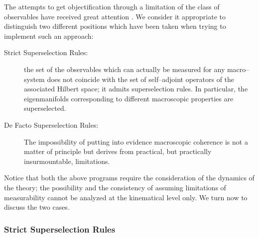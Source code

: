 \documentclass[12pt]{article}
\begin{document}
The attempts to get objectification through a limitation of the
class of observables have received great attention
\cite{ja,dlp,got,zur1,zu,jz}. We consider it appropriate to
distinguish two different positions which have been taken when
trying to implement such an approach:
\begin{description}
\item[Strict Superselection Rules:] the set of the observables
which can actually be measured for any macro--system does not
coincide with the set of self--adjoint operators of the associated
Hilbert space; it admits superselection rules. In particular, the
eigenmanifolds corresponding to different macroscopic properties
are superselected.
\item[De Facto Superselection Rules:] The impossibility of putting
into evidence macroscopic coherence is not a matter of principle
but derives from practical, but practically insurmountable,
limitations.
\end{description}
Notice that both the above programs require the consideration of
the dynamics of the theory; the possibility and the consistency of
assuming limitations of measurability cannot be analyzed at the
kinematical level only. We turn now to discuss the two cases.


\subsubsection{Strict Superselection Rules} \label{sec331}
\end{document}
